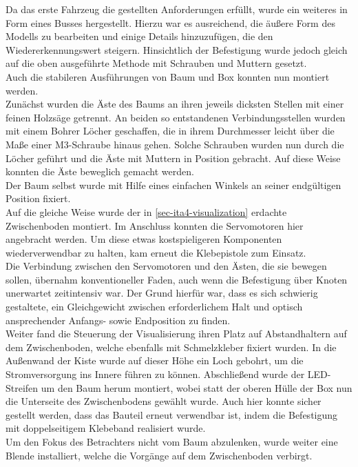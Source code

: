 \documentclass[.../Dokumentation.tex]{subfiles}
\begin{document}
\noindent 
Da das erste Fahrzeug die gestellten Anforderungen erfüllt, wurde ein weiteres 
in Form eines Busses hergestellt. Hierzu war es ausreichend, die äußere Form 
des Modells zu bearbeiten und einige Details hinzuzufügen, die den 
Wiedererkennungswert steigern. Hinsichtlich der Befestigung wurde jedoch 
gleich auf die oben ausgeführte Methode mit Schrauben und Muttern gesetzt.\\
Auch die stabileren Ausführungen von Baum und Box konnten nun montiert werden.\\
Zunächst wurden die Äste des Baums an ihren jeweils dicksten Stellen mit einer 
feinen Holzsäge getrennt. An beiden so entstandenen Verbindungsstellen wurden 
mit einem Bohrer Löcher geschaffen, die in ihrem Durchmesser leicht über die 
Maße einer M3-Schraube hinaus gehen. Solche Schrauben wurden nun durch die 
Löcher geführt und die Äste mit Muttern in Position gebracht. 
Auf diese Weise konnten die Äste beweglich gemacht werden. \\
Der Baum selbst wurde mit Hilfe eines einfachen Winkels an seiner endgültigen 
Position fixiert.\\
Auf die gleiche Weise wurde der in \ref{sec-ita4-visualization} erdachte 
Zwischenboden montiert. Im Anschluss konnten die Servomotoren hier angebracht 
werden. Um diese etwas kostspieligeren Komponenten wiederverwendbar zu halten, 
kam erneut die Klebepistole zum Einsatz.\\
Die Verbindung zwischen den Servomotoren und den Ästen, die sie bewegen sollen, 
übernahm konventioneller Faden, auch wenn die Befestigung über Knoten 
unerwartet zeitintensiv war. Der Grund hierfür war, dass es sich schwierig 
gestaltete, ein Gleichgewicht zwischen erforderlichem Halt und  
optisch ansprechender Anfangs- sowie Endposition zu finden.\\
Weiter fand die Steuerung der Visualisierung ihren Platz auf Abstandhaltern auf 
dem Zwischenboden, welche ebenfalls mit Schmelzkleber fixiert wurden.
In die Außenwand der Kiste wurde auf dieser Höhe ein Loch gebohrt, um die 
Stromversorgung ins Innere führen zu können. 
Abschließend wurde der LED-Streifen um den Baum herum montiert, wobei statt der 
oberen Hülle der Box nun die Unterseite des Zwischenbodens gewählt wurde. 
Auch hier konnte sicher gestellt werden, dass das Bauteil erneut verwendbar 
ist, indem die Befestigung mit doppelseitigem Klebeband realisiert wurde.\\
Um den Fokus des Betrachters nicht vom Baum abzulenken, wurde weiter eine 
Blende installiert, welche die Vorgänge auf dem Zwischenboden verbirgt.
\end{document}
